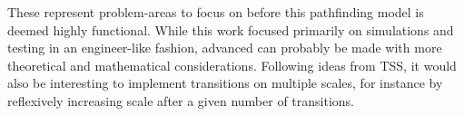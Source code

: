 \documentclass{article}
\begin{document}
    These represent problem-areas to focus on before this pathfinding model is deemed highly functional. While this work focused primarily on simulations and testing in an engineer-like fashion, advanced can probably be made with more theoretical and mathematical considerations. Following ideas from TSS, it would also be interesting to implement transitions on multiple scales, for instance by reflexively increasing scale after a given number of transitions.
\end{document}
